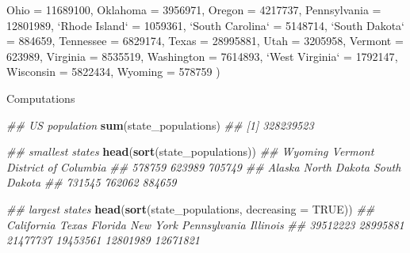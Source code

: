 \documentclass[]{book}
\newenvironment{Shaded}{\begin{snugshade}}{\end{snugshade}}
\newcommand{\CommentTok}[1]{\textcolor[rgb]{0.56,0.35,0.01}{\textit{#1}}}
\newcommand{\DataTypeTok}[1]{\textcolor[rgb]{0.13,0.29,0.53}{#1}}
\newcommand{\DecValTok}[1]{\textcolor[rgb]{0.00,0.00,0.81}{#1}}
\newcommand{\KeywordTok}[1]{\textcolor[rgb]{0.13,0.29,0.53}{\textbf{#1}}}
\newcommand{\NormalTok}[1]{#1}
\newcommand{\OtherTok}[1]{\textcolor[rgb]{0.56,0.35,0.01}{#1}}
\newcommand{\StringTok}[1]{\textcolor[rgb]{0.31,0.60,0.02}{#1}}
\begin{document}
\begin{itemize}
\begin{Shaded}
\begin{Highlighting}[]
    \DataTypeTok{Ohio =} \DecValTok{11689100}\NormalTok{, }\DataTypeTok{Oklahoma =} \DecValTok{3956971}\NormalTok{, }\DataTypeTok{Oregon =} \DecValTok{4217737}\NormalTok{, }\DataTypeTok{Pennsylvania =} \DecValTok{12801989}\NormalTok{,}
    \StringTok{`}\DataTypeTok{Rhode Island}\StringTok{`}\NormalTok{ =}\StringTok{ }\DecValTok{1059361}\NormalTok{, }\StringTok{`}\DataTypeTok{South Carolina}\StringTok{`}\NormalTok{ =}\StringTok{ }\DecValTok{5148714}\NormalTok{, }\StringTok{`}\DataTypeTok{South Dakota}\StringTok{`}\NormalTok{ =}\StringTok{ }\DecValTok{884659}\NormalTok{,}
    \DataTypeTok{Tennessee =} \DecValTok{6829174}\NormalTok{, }\DataTypeTok{Texas =} \DecValTok{28995881}\NormalTok{, }\DataTypeTok{Utah =} \DecValTok{3205958}\NormalTok{, }\DataTypeTok{Vermont =} \DecValTok{623989}\NormalTok{,}
    \DataTypeTok{Virginia =} \DecValTok{8535519}\NormalTok{, }\DataTypeTok{Washington =} \DecValTok{7614893}\NormalTok{, }\StringTok{`}\DataTypeTok{West Virginia}\StringTok{`}\NormalTok{ =}\StringTok{ }\DecValTok{1792147}\NormalTok{,}
    \DataTypeTok{Wisconsin =} \DecValTok{5822434}\NormalTok{, }\DataTypeTok{Wyoming =} \DecValTok{578759}
\NormalTok{)}
\end{Highlighting}
\end{Shaded}

  Computations

\begin{Shaded}
\begin{Highlighting}[]
\CommentTok{## US population}
\KeywordTok{sum}\NormalTok{(state_populations)}
\CommentTok{## [1] 328239523}

\CommentTok{## smallest states}
\KeywordTok{head}\NormalTok{(}\KeywordTok{sort}\NormalTok{(state_populations))}
\CommentTok{##              Wyoming              Vermont District of Columbia }
\CommentTok{##               578759               623989               705749 }
\CommentTok{##               Alaska         North Dakota         South Dakota }
\CommentTok{##               731545               762062               884659}

\CommentTok{## largest states}
\KeywordTok{head}\NormalTok{(}\KeywordTok{sort}\NormalTok{(state_populations, }\DataTypeTok{decreasing =} \OtherTok{TRUE}\NormalTok{))}
\CommentTok{##   California        Texas      Florida     New York Pennsylvania     Illinois }
\CommentTok{##     39512223     28995881     21477737     19453561     12801989     12671821}


\end{Highlighting}
\end{Shaded}
\end{itemize}
\end{document}
